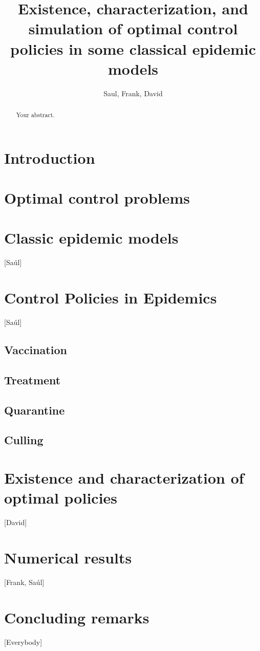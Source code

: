 \documentclass[a4paper]{article}
\title{
	Existence, characterization, and simulation
	of optimal control policies in some classical epidemic models
}
\author{Saul, Frank, David}
\begin{document}
	\maketitle

	\begin{abstract}
		Your abstract.
	\end{abstract}
%
	\section{Introduction}
	\section{Optimal control problems}
		
	\section{Classic epidemic models}
	[Saúl]
	\section{Control Policies in Epidemics}
	[Saúl]
    	
	    \subsection{Vaccination}
	    	
	    \subsection{Treatment}
	    	
	    \subsection{Quarantine}
	    	
	    \subsection{Culling}
	    	
	\section{Existence and characterization of optimal policies}
		[David]
	\section{Numerical results}
		[Frank, Saúl]
	\section{Concluding remarks}
		[Everybody]
%
	
	
\end{document}
